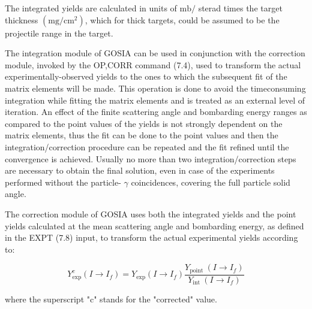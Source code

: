 \documentclass[10pt]{article}
\begin{document}
The integrated yields are calculated in units of $\mathrm{mb} /$ sterad times the target thickness $\left(\mathrm{mg} / \mathrm{cm}^{2}\right)$, which for thick targets, could be assumed to be the projectile range in the target.

The integration module of GOSIA can be used in conjunction with the correction module, invoked by the OP,CORR command (7.4), used to transform the actual experimentally-observed yields to the ones to which the subsequent fit of the matrix elements will be made. This operation is done to avoid the timeconsuming integration while fitting the matrix elements and is treated as an external level of iteration. An effect of the finite scattering angle and bombarding energy ranges as compared to the point values of the yields is not strongly dependent on the matrix elements, thus the fit can be done to the point values and then the integration/correction procedure can be repeated and the fit refined until the convergence is achieved. Usually no more than two integration/correction steps are necessary to obtain the final solution, even in case of the experiments performed without the particle- $\gamma$ coincidences, covering the full particle solid angle.

The correction module of GOSIA uses both the integrated yields and the point yields calculated at the mean scattering angle and bombarding energy, as defined in the EXPT (7.8) input, to transform the actual experimental yields according to:


\begin{equation*}
Y_{\exp }^{c}\left(I \rightarrow I_{f}\right)=Y_{\exp }\left(I \rightarrow I_{f}\right) \frac{Y_{\text {point }}\left(I \rightarrow I_{f}\right)}{Y_{\text {int }}\left(I \rightarrow I_{f}\right)} \tag{6.45}
\end{equation*}


where the superscript "c" stands for the "corrected" value.
\end{document}
